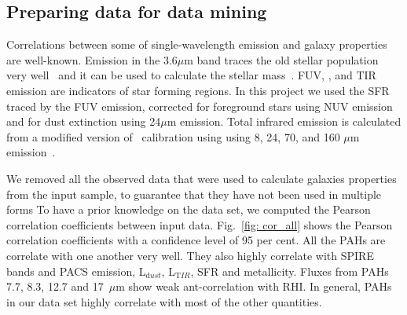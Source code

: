        \subsection{Preparing data for data mining}
    
     Correlations between some of single-wavelength emission and galaxy properties are well-known.
     Emission in the 3.6$\mu$m band traces the old stellar population very well~\citep[e.g]{Leitherer99,Smith07a} and it can be used to calculate the stellar mass~\citep{Eskew12}.
     FUV, \halpha, and TIR emission are indicators of star forming regions.
     In this project we used the SFR traced by the FUV emission, corrected for foreground stars using NUV emission and for dust extinction using 24$\mu$m emission.
     Total infrared emission is calculated from a modified version of~\cite{Draine07} calibration using using 8, 24, 70, and 160 $\mu$m emission~\citep{Boquien10}.
    
    We removed all the observed data that were used to calculate galaxies properties from the input sample, to guarantee that they have not been used in multiple forms
    To have a prior knowledge on the data set, %
    we computed the Pearson correlation coefficients between input data.
    Fig.~\ref{fig: cor_all} shows the Pearson correlation coefficients with a confidence level of 95 per cent. 
    All the PAHs are correlate with one another very well.
    They also highly correlate with SPIRE bands and PACS emission, L$_{\mathrm dust}$, L$_{\mathrm TIR}$, SFR and metallicity.
    Fluxes from PAHs 7.7, 8.3, 12.7 and 17~$\mu$m show weak ant-correlation with RHI.
    In general, PAHs in our data set highly correlate with most of the other quantities. 
    

